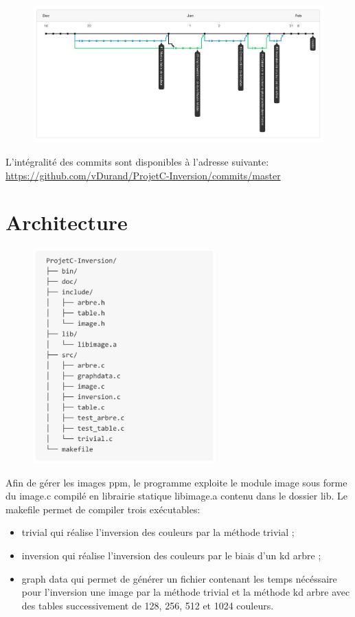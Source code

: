\documentclass[a4paper,11pt,final]{article}
\begin{document}
\begin{figure}[ht!]
	\centering
	\includegraphics[width=150mm]{./pic/gitTree.jpg}
\end{figure}

L’intégralité des commits sont disponibles à l’adresse suivante: \url{https://github.com/vDurand/ProjetC-Inversion/commits/master}

\section{Architecture}

\begin{figure}[!ht]
    \centering
    \includegraphics[width=70mm]{./pic/directoryStructure.jpg}
\end{figure}

Afin de gérer les images ppm, le programme exploite le module image sous forme du image.c compilé en librairie statique libimage.a contenu dans le dossier lib. Le makefile permet de compiler trois exécutables:
\begin{itemize}
\item trivial qui réalise l’inversion des couleurs par la méthode trivial ;
\item inversion qui réalise l’inversion des couleurs par le biais d’un kd arbre ;
\item graph data qui permet de générer un fichier contenant les temps nécéssaire pour l’inversion une image par la méthode trivial et la méthode kd arbre avec des tables successivement de 128, 256, 512 et 1024 couleurs.
\end{itemize}
\end{document}
